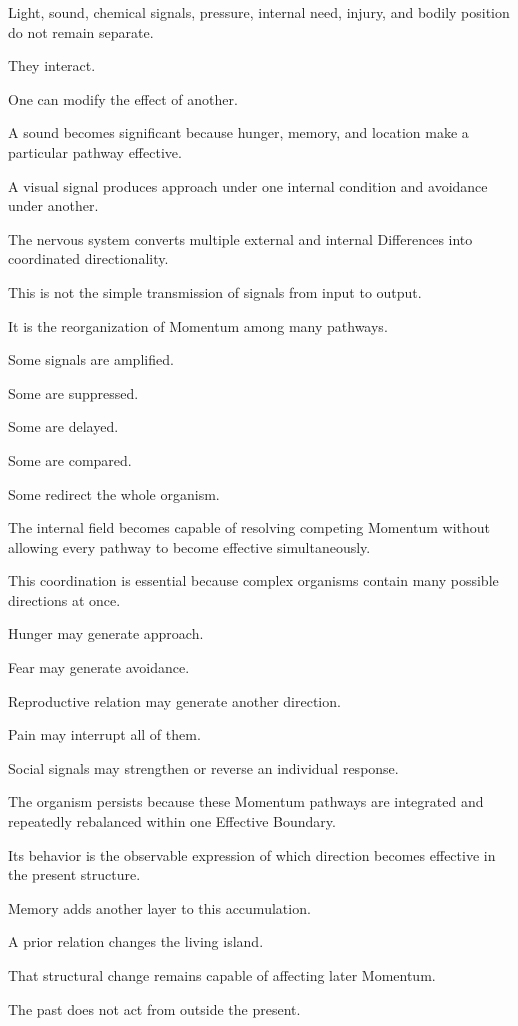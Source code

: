 Light, sound, chemical signals, pressure, internal need, injury, and bodily position do not remain separate.

They interact.

One can modify the effect of another.

A sound becomes significant because hunger, memory, and location make a particular pathway effective.

A visual signal produces approach under one internal condition and avoidance under another.

The nervous system converts multiple external and internal Differences into coordinated directionality.

This is not the simple transmission of signals from input to output.

It is the reorganization of Momentum among many pathways.

Some signals are amplified.

Some are suppressed.

Some are delayed.

Some are compared.

Some redirect the whole organism.

The internal field becomes capable of resolving competing Momentum without allowing every pathway to become effective simultaneously.

This coordination is essential because complex organisms contain many possible directions at once.

Hunger may generate approach.

Fear may generate avoidance.

Reproductive relation may generate another direction.

Pain may interrupt all of them.

Social signals may strengthen or reverse an individual response.

The organism persists because these Momentum pathways are integrated and repeatedly rebalanced within one Effective Boundary.

Its behavior is the observable expression of which direction becomes effective in the present structure.

Memory adds another layer to this accumulation.

A prior relation changes the living island.

That structural change remains capable of affecting later Momentum.

The past does not act from outside the present.

